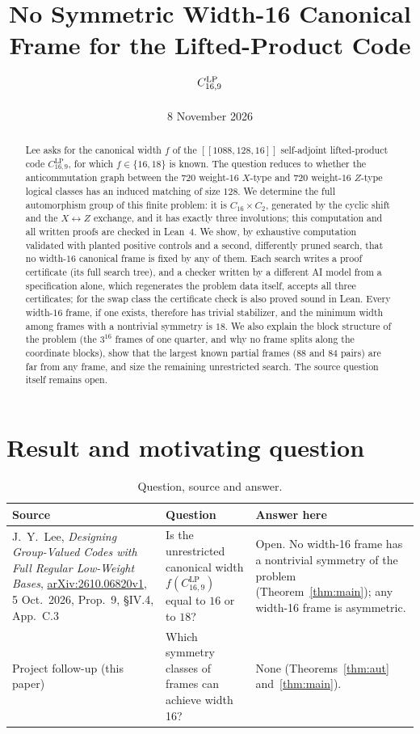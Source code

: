 \documentclass[11pt]{article}
\title{No Symmetric Width-16 Canonical Frame for the Lifted-Product Code $\CLP$}
\author{}
\date{8 November 2026}
\theoremstyle{definition}
\theoremstyle{remark}
\newcommand{\CLP}{C^{\mathrm{LP}}_{16,9}}
\begin{document}
\maketitle

\begin{abstract}
Lee asks for the canonical width $f$ of the $[[1088,128,16]]$ self-adjoint lifted-product code $\CLP$, for which $f\in\{16,18\}$ is known. The question reduces to whether the anticommutation graph between the $720$ weight-$16$ $X$-type and $720$ weight-$16$ $Z$-type logical classes has an induced matching of size $128$. We determine the full automorphism group of this finite problem: it is $C_{16}\times C_2$, generated by the cyclic shift and the $X\leftrightarrow Z$ exchange, and it has exactly three involutions; this computation and all written proofs are checked in Lean~4. We show, by exhaustive computation validated with planted positive controls and a second, differently pruned search, that no width-$16$ canonical frame is fixed by any of them. Each search writes a proof certificate (its full search tree), and a checker written by a different AI model from a specification alone, which regenerates the problem data itself, accepts all three certificates; for the swap class the certificate check is also proved sound in Lean. Every width-$16$ frame, if one exists, therefore has trivial stabilizer, and the minimum width among frames with a nontrivial symmetry is $18$. We also explain the block structure of the problem (the $3^{16}$ frames of one quarter, and why no frame splits along the coordinate blocks), show that the largest known partial frames ($88$ and $84$ pairs) are far from any frame, and size the remaining unrestricted search. The source question itself remains open.
\end{abstract}

\section{Result and motivating question}

\begin{table}[h]
\centering\small
\begin{tabular}{@{}p{4.6cm}p{5.2cm}p{5.6cm}@{}}
\toprule
Source & Question & Answer here \\
\midrule
J.~Y.~Lee, \emph{Designing Group-Valued Codes with Full Regular Low-Weight Bases}, \href{https://arxiv.org/html/2610.06820v1}{arXiv:2610.06820v1}, 5 Oct.\ 2026, Prop.~9, \S IV.4, App.~C.3~\cite{lee} &
Is the unrestricted canonical width $f(\CLP)$ equal to $16$ or to $18$? &
Open. No width-16 frame has a nontrivial symmetry of the problem (Theorem~\ref{thm:main}); any width-16 frame is asymmetric. \\
Project follow-up (this paper) & Which symmetry classes of frames can achieve width 16? & None (Theorems~\ref{thm:aut} and~\ref{thm:main}). \\
\bottomrule
\end{tabular}
\caption{Question, source and answer.}\label{tab:qsa}
\end{table}
\end{document}
